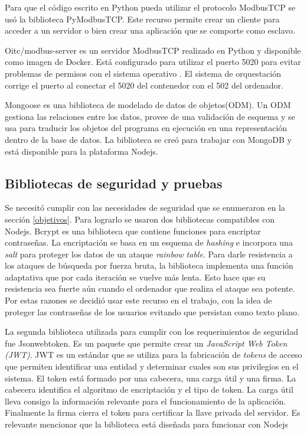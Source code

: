Para que el código escrito en Python pueda utilizar el protocolo ModbusTCP se usó la biblioteca PyModbusTCP.
Este recurso permite crear un cliente para acceder a un servidor o bien crear una aplicación que se comporte como esclavo.

Oitc/modbus-server es un servidor ModbusTCP realizado en Python y disponible como imagen de Docker.
Está configurado para utilizar el puerto 5020 para evitar problemas de permisos con el sistema operativo \citep{WEBSITE:dockerhubModbus}.
El sistema de orquestación corrige el puerto al conectar el 5020 del contenedor con el 502 del ordenador.

Mongoose es una biblioteca de modelado de datos de objetos(ODM).
Un ODM gestiona las relaciones entre los datos, provee de una validación de esquema y se usa para traducir los objetos del programa en ejecución en una representación dentro de la base de datos.
La biblioteca se creó para trabajar con MongoDB y está disponible para la plataforma Nodejs.

\subsection{Bibliotecas de seguridad y pruebas}
Se necesitó cumplir con las necesidades de seguridad que se enumeraron en la sección \ref{objetivos}.
Para lograrlo se usaron dos bibliotecas compatibles con Nodejs.
Bcrypt es una biblioteca que contiene funciones para encriptar contraseñas.
La encriptación se basa en un esquema de \emph{hashing} e incorpora una \emph{salt} para proteger los datos de un ataque \emph{rainbow table}.
Para darle resistencia a los ataques de búsqueda por fuerza bruta, la biblioteca implementa una función adaptativa que por cada iteración se vuelve más lenta.
Esto hace que su resistencia sea fuerte aún cuando el ordenador que realiza el ataque sea potente.
Por estas razones se decidió usar este recurso en el trabajo, con la idea de proteger las contraseñas de los usuarios evitando que persistan como texto plano.

La segunda biblioteca utilizada para cumplir con los requerimientos de seguridad fue Jsonwebtoken.
Es un paquete que permite crear un \emph{JavaScript Web Token (JWT)}.
JWT es un estándar que se utiliza para la fabricación de \emph{tokens} de acceso que permiten identificar una entidad y determinar cuales son sus privilegios en el sistema.
El token está formado por una cabecera, una carga útil y una firma.
La cabecera identifica el algoritmo de encriptación y el tipo de token.
La carga útil lleva consigo la información relevante para el funcionamiento de la aplicación.
Finalmente la firma cierra el token para certificar la llave privada del servidor.
Es relevante mencionar que la biblioteca está diseñada para funcionar con Nodejs

